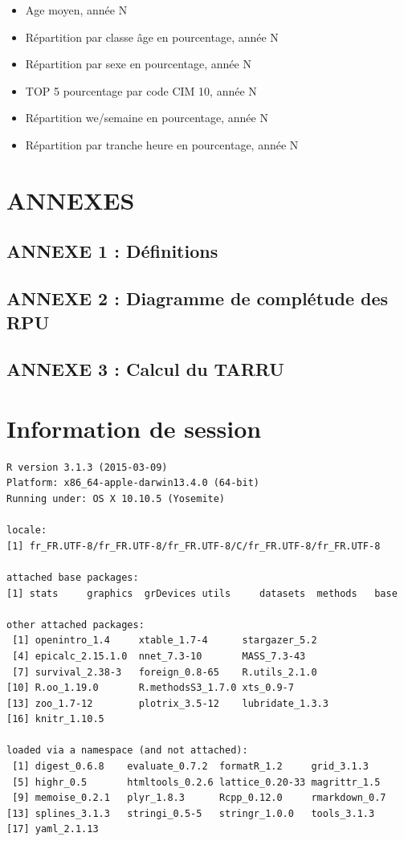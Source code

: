\documentclass[]{article}
\begin{document}
\begin{itemize}
\itemsep1pt\parskip0pt
\item
  Age moyen, année N
\item
  Répartition par classe âge en pourcentage, année N
\item
  Répartition par sexe en pourcentage, année N
\item
  TOP 5 pourcentage par code CIM 10, année N
\item
  Répartition we/semaine en pourcentage, année N
\item
  Répartition par tranche heure en pourcentage, année N
\end{itemize}

\section{ANNEXES}\label{annexes}

\subsection{ANNEXE 1 : Définitions}\label{annexe-1-definitions}

\subsection{ANNEXE 2 : Diagramme de complétude des
RPU}\label{annexe-2-diagramme-de-completude-des-rpu}

\subsection{ANNEXE 3 : Calcul du TARRU}\label{annexe-3-calcul-du-tarru}

\section{Information de session}\label{information-de-session}

\begin{verbatim}
R version 3.1.3 (2015-03-09)
Platform: x86_64-apple-darwin13.4.0 (64-bit)
Running under: OS X 10.10.5 (Yosemite)

locale:
[1] fr_FR.UTF-8/fr_FR.UTF-8/fr_FR.UTF-8/C/fr_FR.UTF-8/fr_FR.UTF-8

attached base packages:
[1] stats     graphics  grDevices utils     datasets  methods   base     

other attached packages:
 [1] openintro_1.4     xtable_1.7-4      stargazer_5.2    
 [4] epicalc_2.15.1.0  nnet_7.3-10       MASS_7.3-43      
 [7] survival_2.38-3   foreign_0.8-65    R.utils_2.1.0    
[10] R.oo_1.19.0       R.methodsS3_1.7.0 xts_0.9-7        
[13] zoo_1.7-12        plotrix_3.5-12    lubridate_1.3.3  
[16] knitr_1.10.5     

loaded via a namespace (and not attached):
 [1] digest_0.6.8    evaluate_0.7.2  formatR_1.2     grid_3.1.3     
 [5] highr_0.5       htmltools_0.2.6 lattice_0.20-33 magrittr_1.5   
 [9] memoise_0.2.1   plyr_1.8.3      Rcpp_0.12.0     rmarkdown_0.7  
[13] splines_3.1.3   stringi_0.5-5   stringr_1.0.0   tools_3.1.3    
[17] yaml_2.1.13    
\end{verbatim}
\end{document}
